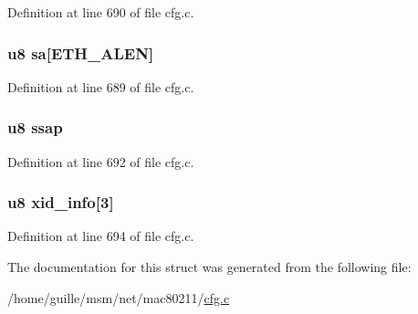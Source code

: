 Definition at line 690 of file cfg.\-c.

\hypertarget{structiapp__layer2__update_a1d248d85a9aee0de13f6a2647297e517}{
\subsubsection[{sa}]{\setlength{\rightskip}{0pt plus 5cm}u8 sa\mbox{[}E\-T\-H\-\_\-\-A\-L\-E\-N\mbox{]}}}\label{structiapp__layer2__update_a1d248d85a9aee0de13f6a2647297e517}


Definition at line 689 of file cfg.\-c.

\hypertarget{structiapp__layer2__update_ae78f5fb673d337315fe87a2a4dc04c39}{
\subsubsection[{ssap}]{\setlength{\rightskip}{0pt plus 5cm}u8 ssap}}\label{structiapp__layer2__update_ae78f5fb673d337315fe87a2a4dc04c39}


Definition at line 692 of file cfg.\-c.

\hypertarget{structiapp__layer2__update_ab19e66e83f523eb4706bd46459a44400}{
\subsubsection[{xid\-\_\-info}]{\setlength{\rightskip}{0pt plus 5cm}u8 xid\-\_\-info\mbox{[}3\mbox{]}}}\label{structiapp__layer2__update_ab19e66e83f523eb4706bd46459a44400}


Definition at line 694 of file cfg.\-c.



The documentation for this struct was generated from the following file\-:\begin{DoxyCompactItemize}
\item 
/home/guille/msm/net/mac80211/\hyperlink{cfg_8c}{cfg.\-c}\end{DoxyCompactItemize}
